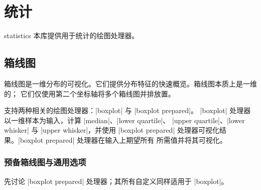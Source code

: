 
\section{统计}

\begingroup
\def\pgfplotsmanualcurlibrary{statistics}

\begin{pgfplotslibrary}{statistics}
    本库提供用于统计的绘图处理器。
\end{pgfplotslibrary}


\subsection{箱线图}
\label{sec:boxplots}

\begingroup

\oldgraykeyprefixes
{}%

箱线图是一维分布的可视化。它们提供分布特征的快速概览。箱线图本质上是一维的；
它们仅使用第二个坐标轴将多个箱线图并排放置。

\PGFPlots{} 支持两种相关的绘图处理器：|boxplot| 与 |boxplot prepared|。
|boxplot| 处理器以一维样本为输入，计算 |median|、|lower quartile|、
|upper quartile|、|lower whisker| 与 |upper whisker|，并使用
|boxplot prepared| 处理器可视化结果。|boxplot prepared| 处理器在输入上期望所有
所需值并将其可视化。


\subsubsection{预备箱线图与通用选项}

先讨论 |boxplot prepared| 处理器；其所有自定义同样适用于 |boxplot|。

